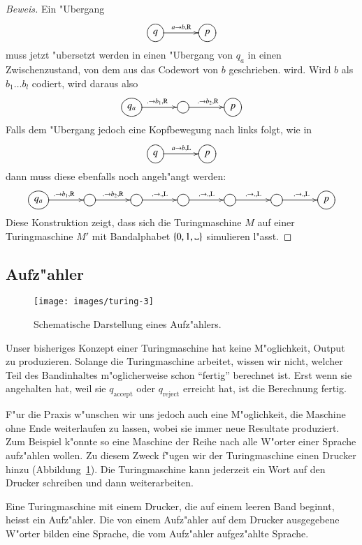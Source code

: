 \begin{proof}[Beweis]
Ein "Ubergang
\[
\entrymodifiers={++[o][F]}
\xymatrix@C+1pc{
q\ar[r]^{a\to b,\text{R}}
	&p
}
\]
muss jetzt "ubersetzt werden in einen "Ubergang von $q_a$ in einen
Zwischenzustand, von dem aus das Codewort von $b$ geschrieben.
wird. Wird $b$ als $b_1\dots b_l$ codiert, wird daraus also
\[
\entrymodifiers={++[o][F]}
\xymatrix@C+1pc{
q_a\ar[r]^{.\to b_1,\text{R}}
	&\ar[r]^{.\to b_2,\text{R}}
		&p
}
\]
Falls dem "Ubergang jedoch eine Kopfbewegung nach links folgt, wie in
\[
\entrymodifiers={++[o][F]}
\xymatrix@C+1pc{
q\ar[r]^{a\to b,\text{L}}
	&p
}
\]
dann muss diese ebenfalls noch angeh"angt werden:
\[
\entrymodifiers={++[o][F]}
\xymatrix@C+1pc{
q_a\ar[r]^{.\to b_1,\text{R}}
	&\ar[r]^{.\to b_2,\text{R}}
		&\ar[r]^{.\to .,\text{L}}
			&\ar[r]^{.\to .,\text{L}}
				&\ar[r]^{.\to .,\text{L}}
					&\ar[r]^{.\to .,\text{L}}
						&p
}
\]
Diese Konstruktion zeigt, dass sich die Turingmaschine $M$ auf einer
Turingmaschine $M'$ mit Bandalphabet $\{0,1,\blank\}$ simulieren
l"asst.
\end{proof}

\subsection{Aufz"ahler}
\begin{figure}
\begin{center}
\texttt{[image: images/turing-3]}
\end{center}
\caption{Schematische Darstellung eines Aufz"ahlers.\label{turing-aufzaehler}}
\end{figure}
Unser bisheriges Konzept einer Turingmaschine hat keine M"oglichkeit,
Output zu produzieren. Solange die Turingmaschine arbeitet, wissen wir
nicht, welcher Teil des Bandinhaltes m"oglicherweise schon ``fertig''
berechnet ist. Erst wenn sie angehalten hat, weil sie $q_{\text{accept}}$
oder $q_{\text{reject}}$ erreicht hat, ist die Berechnung fertig.

F"ur die Praxis w"unschen wir uns jedoch auch eine M"oglichkeit,
die Maschine ohne Ende weiterlaufen zu lassen, wobei sie immer neue
Resultate produziert. Zum Beispiel k"onnte so eine Maschine der Reihe
nach alle W"orter einer Sprache aufz"ahlen wollen. Zu diesem Zweck
f"ugen wir der Turingmaschine einen Drucker hinzu
(Abbildung~\ref{turing-aufzaehler}). Die Turingmaschine
kann jederzeit ein Wort auf den Drucker schreiben und dann
weiterarbeiten.

\begin{definition}
Eine Turingmaschine mit einem Drucker, die auf einem leeren Band beginnt,
heisst ein Aufz"ahler. Die von einem Aufz"ahler auf dem Drucker ausgegebene
W"orter bilden eine Sprache, die vom Aufz"ahler aufgez"ahlte Sprache.
\end{definition}

